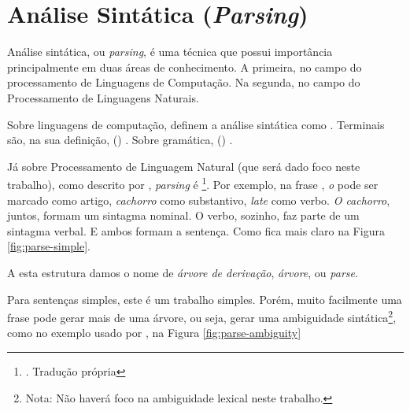 \section{Análise Sintática (\textit{Parsing})}
\label{sec:parsing}

Análise sintática, ou \textit{parsing}, é uma técnica que possui importância principalmente em duas áreas de conhecimento. A primeira, no campo do processamento de Linguagens de Computação. Na segunda, no campo do Processamento de Linguagens Naturais.

Sobre linguagens de computação,  definem a análise sintática como . Terminais são, na sua definição, (\textit{}) . Sobre gramática, (\textit{}) . 

Já sobre Processamento de Linguagem Natural (que será dado foco neste trabalho), como descrito por , \textit{parsing} é  \footnote{. Tradução própria}. Por exemplo, na frase , \textit{o} pode ser marcado como artigo, \textit{cachorro} como substantivo, \textit{late} como verbo. \textit{O cachorro}, juntos, formam um sintagma nominal. O verbo, sozinho, faz parte de um sintagma verbal. E ambos formam a sentença. Como fica mais claro na Figura \ref{fig:parse-simple}.

\begin{center}
    
\end{center}

A esta estrutura damos o nome de \textit{árvore de derivação}, \textit{árvore}, ou \textit{parse}.

Para sentenças simples, este é um trabalho simples. Porém, muito facilmente uma frase pode gerar mais de uma árvore, ou seja, gerar uma ambiguidade sintática\footnote{Nota: Não haverá foco na ambiguidade lexical neste trabalho.}, como no exemplo usado por , na Figura \ref{fig:parse-ambiguity}

\begin{center}
    
\end{center}

